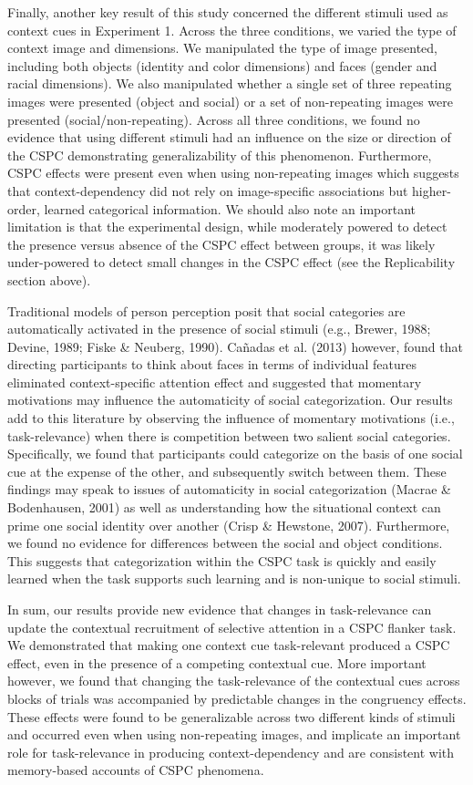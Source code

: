 \documentclass[english,,man,floatsintext]{apa6}
\begin{document}
Finally, another key result of this study concerned the different stimuli used as context cues in Experiment 1. Across the three conditions, we varied the type of context image and dimensions. We manipulated the type of image presented, including both objects (identity and color dimensions) and faces (gender and racial dimensions). We also manipulated whether a single set of three repeating images were presented (object and social) or a set of non-repeating images were presented (social/non-repeating). Across all three conditions, we found no evidence that using different stimuli had an influence on the size or direction of the CSPC demonstrating generalizability of this phenomenon. Furthermore, CSPC effects were present even when using non-repeating images which suggests that context-dependency did not rely on image-specific associations but higher-order, learned categorical information. We should also note an important limitation is that the experimental design, while moderately powered to detect the presence versus absence of the CSPC effect between groups, it was likely under-powered to detect small changes in the CSPC effect (see the Replicability section above).

Traditional models of person perception posit that social categories are automatically activated in the presence of social stimuli (e.g., Brewer, 1988; Devine, 1989; Fiske \& Neuberg, 1990). Cañadas et al. (2013) however, found that directing participants to think about faces in terms of individual features eliminated context-specific attention effect and suggested that momentary motivations may influence the automaticity of social categorization. Our results add to this literature by observing the influence of momentary motivations (i.e., task-relevance) when there is competition between two salient social categories. Specifically, we found that participants could categorize on the basis of one social cue at the expense of the other, and subsequently switch between them. These findings may speak to issues of automaticity in social categorization (Macrae \& Bodenhausen, 2001) as well as understanding how the situational context can prime one social identity over another (Crisp \& Hewstone, 2007). Furthermore, we found no evidence for differences between the social and object conditions. This suggests that categorization within the CSPC task is quickly and easily learned when the task supports such learning and is non-unique to social stimuli.

In sum, our results provide new evidence that changes in task-relevance can update the contextual recruitment of selective attention in a CSPC flanker task. We demonstrated that making one context cue task-relevant produced a CSPC effect, even in the presence of a competing contextual cue. More important however, we found that changing the task-relevance of the contextual cues across blocks of trials was accompanied by predictable changes in the congruency effects. These effects were found to be generalizable across two different kinds of stimuli and occurred even when using non-repeating images, and implicate an important role for task-relevance in producing context-dependency and are consistent with memory-based accounts of CSPC phenomena.
\end{document}
